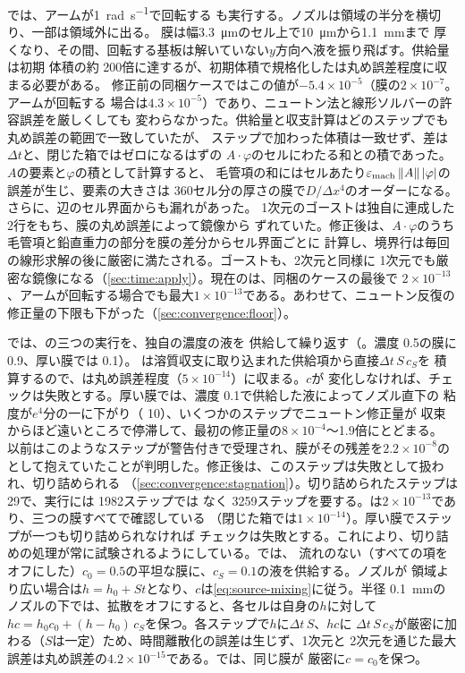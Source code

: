 では、アームが\SI{1}{\radian\per\second}で回転する
も実行する。ノズルは領域の半分を横切り、一部は領域外に出る。
膜は幅\SI{3.3}{\micro\metre}のセル上で\SI{10}{\micro\metre}から\SI{1.1}{\milli\metre}まで
厚くなり、その間、回転する基板は解いていない$y$方向へ液を振り飛ばす。供給量は初期
体積の約 200倍に達するが、初期体積で規格化したは丸め誤差程度に収まる必要がある。
修正前の同梱ケースではこの値が$-5.4\times10^{-5}$（膜の$2\times10^{-7}$。アームが回転する
場合は$4.3\times10^{-5}$）であり、ニュートン法と線形ソルバーの許容誤差を厳しくしても
変わらなかった。供給量と収支計算はどのステップでも丸め誤差の範囲で一致していたが、
ステップで加わった体積は一致せず、差は$\Delta t$と、閉じた箱ではゼロになるはずの
$A\cdot\varphi$のセルにわたる和との積であった。$A$の要素と$\varphi$の積として計算すると、
毛管項の和にはセルあたり$\varepsilon_{\mathrm{mach}}\,\lVert A\rVert\,\lvert\varphi\rvert$の誤差が生じ、要素の大きさは
360セル分の厚さの膜で$D/\Delta x^{4}$のオーダーになる。さらに、辺のセル界面からも漏れがあった。
1次元のゴーストは独自に連成した 2行をもち、膜の丸め誤差によって鏡像から
ずれていた。修正後は、$A\cdot\varphi$のうち毛管項と鉛直重力の部分を膜の差分からセル界面ごとに
計算し、境界行は毎回の線形求解の後に厳密に満たされる。ゴーストも、2次元と同様に
1次元でも厳密な鏡像になる（\cref{sec:time:apply}）。現在のは、同梱のケースの最後で
$2\times10^{-13}$、アームが回転する場合でも最大$1\times10^{-13}$である。あわせて、ニュートン反復の
修正量の下限も下がった（\cref{sec:convergence:floor}）。

では、の三つの実行を、独自の濃度の液を
供給して繰り返す（。濃度 0.5の膜に 0.9、厚い膜では 0.1）。
は溶質収支に取り込まれた供給項から直接$\Delta t\,S\,c_S$を
積算するので、は丸め誤差程度（$5\times10^{-14}$）に収まる。$c$が
変化しなければ、チェックは失敗とする。厚い膜では、濃度 0.1で供給した液によってノズル直下の
粘度が$e^{4}$分の一に下がり（ 10）、いくつかのステップでニュートン修正量が
収束からほど遠いところで停滞して、最初の修正量の$8\times10^{-4}$〜1.9倍にとどまる。
以前はこのようなステップが警告付きで受理され、膜がその残差を$2.2\times10^{-8}$の
として抱えていたことが判明した。修正後は、このステップは失敗として扱われ、切り詰められる
（\cref{sec:convergence:stagnation}）。切り詰められたステップは 29で、実行には 1982ステップでは
なく 3259ステップを要する。は$2\times10^{-13}$であり、三つの膜すべてで確認している
（閉じた箱では$1\times10^{-14}$）。厚い膜でステップが一つも切り詰められなければ
チェックは失敗とする。これにより、切り詰めの処理が常に試験されるようにしている。では、
流れのない（すべての項をオフにした）$c_0 = 0.5$の平坦な膜に、$c_S = 0.1$の液を供給する。ノズルが
領域より広い場合は$h = h_0 + St$となり、$c$は\cref{eq:source-mixing}に従う。半径
\SI{0.1}{\milli\metre}のノズルの下では、拡散をオフにすると、各セルは自身の$h$に対して
$hc = h_0c_0 + (h - h_0)\,c_S$を保つ。各ステップで$h$に$\Delta t\,S$、$hc$に
$\Delta t\,S\,c_S$が厳密に加わる（$S$は一定）ため、時間離散化の誤差は生じず、1次元と
2次元を通じた最大誤差は丸め誤差の$4.2\times10^{-15}$である。では、同じ膜が
厳密に$c = c_0$を保つ。

